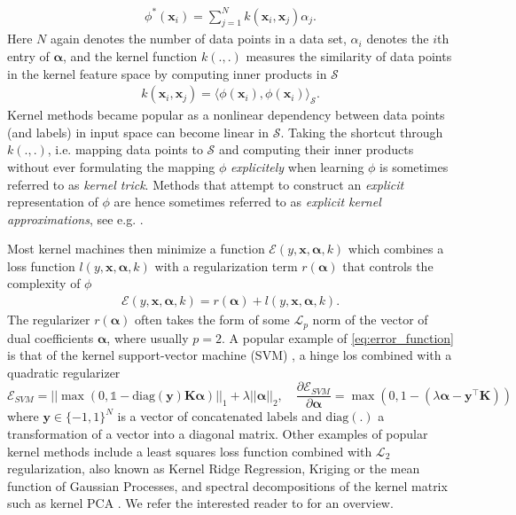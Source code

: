 \documentclass{article} %
\newcommand{\ones}{\ensuremath{\mathds{1}}}
\newcommand{\va}{\boldsymbol{\alpha}}
\newcommand{\Bx}{\mathbf{x}}
\renewcommand{\vec}[1]{\mathbf{#1}}
\begin{document}
\begin{align}\label{eq:kernel_trick}
\phi^*(\Bx_i)=\sum_{j=1}^N k(\Bx_i,\Bx_j)\alpha_j.
\end{align}
Here $N$ again denotes the number of data points in a data set, $\alpha_i$ denotes the $i$th entry of $\va$, and the kernel function $k(.,.)$ measures the similarity of data points in the kernel feature space by computing inner products in $\mathcal{S}$
\begin{align}\label{eq:kernel_function}
k(\Bx_i,\Bx_j)=\langle \phi(\Bx_i), \phi(\Bx_i)\rangle_{\mathcal{S}}.
\end{align}
%
Kernel methods became popular as a nonlinear dependency between data points (and labels) in input space can become linear in $\mathcal{S}$.
Taking the shortcut through $k(.,.)$, i.e. mapping data points to $\mathcal{S}$ and computing their inner products without ever formulating the mapping $\phi$ {\em explicitely} when learning $\phi$ is sometimes referred to as {\em kernel trick}. Methods that attempt to construct an {\em explicit} representation of $\phi$ are hence sometimes referred to as {\em explicit kernel approximations}, see e.g. \cite{Dai2014}. 

Most kernel machines then minimize a function $\mathcal{E}(y, \Bx, \va, k)$ which combines a loss function $l(y, \Bx, \va, k)$ with a regularization term $r(\va)$ that controls the complexity of $\phi$ 
%
\begin{align}\label{eq:error_function}
\mathcal{E}(y, \Bx, \va, k) = r(\va) + l(y, \Bx, \va, k).
\end{align}
%
The regularizer $r(\va)$ often takes the form of some $\mathcal{L}_p$ norm of the vector of dual coefficients $\va$, where usually $p=2$. A popular example of \autoref{eq:error_function} is that of the kernel support-vector machine (SVM) \cite{Cortes1995}, a hinge los combined with a quadratic regularizer
%
\begin{equation}\label{eq:svm_gradient}
\mathcal{E}_{SVM} = ||\max \left(0,\ones-\text{diag}(\vec{y}) \vec{K} \va \right)||_1 + \lambda ||\va||_2, \quad \frac{\partial\mathcal{E}_{SVM}}{\partial \va} =\max \left(0,1-\left(\lambda\va - \vec{y}^{\top}\vec{K}\right)\right)
\end{equation}
%
where $\vec{y}\in\{-1,1\}^N$ is a vector of concatenated labels and $\text{diag}(.)$ a transformation of a vector into a diagonal matrix. 
Other examples of popular kernel methods include a least squares loss function combined with $\mathcal{L}_2$ regularization, also known as Kernel Ridge Regression, Kriging \cite{kriging} or the mean function of Gaussian Processes, and spectral decompositions of the kernel matrix such as kernel PCA \cite{Scholkopf:1998p427}. We refer the interested reader to \cite{shawe2004kernel} for an overview. 
\end{document}

